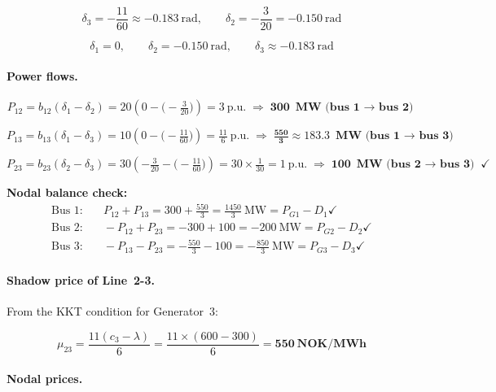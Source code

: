 \[
  \delta_3 = -\frac{11}{60} \approx -0.183~\text{rad},\qquad
  \delta_2 = -\frac{3}{20} = -0.150~\text{rad}
\]

\[
  \delta_1 = 0,\qquad
  \delta_2 = -0.150~\text{rad},\qquad
  \delta_3 \approx -0.183~\text{rad}
\]

\paragraph{Power flows.}

\[
  P_{12} = b_{12}(\delta_1 - \delta_2)
         = 20\!\left(0 - \bigl(-\tfrac{3}{20}\bigr)\right)
         = 3~\text{p.u.}
         \;\Rightarrow\; \mathbf{300~\text{MW (bus 1 $\to$ bus 2)}}
\]

\[
  P_{13} = b_{13}(\delta_1 - \delta_3)
         = 10\!\left(0 - \bigl(-\tfrac{11}{60}\bigr)\right)
         = \tfrac{11}{6}~\text{p.u.}
         \;\Rightarrow\; \mathbf{\tfrac{550}{3} \approx 183.3~\text{MW (bus 1 $\to$ bus 3)}}
\]

\[
  P_{23} = b_{23}(\delta_2 - \delta_3)
         = 30\!\left(-\tfrac{3}{20} - \bigl(-\tfrac{11}{60}\bigr)\right)
         = 30 \times \tfrac{1}{30}
         = 1~\text{p.u.}
         \;\Rightarrow\; \mathbf{100~\text{MW (bus 2 $\to$ bus 3)}} \;\checkmark
\]

\noindent\textbf{Nodal balance check:}
\begin{align*}
  \text{Bus 1:} &\quad P_{12} + P_{13} = 300 + \tfrac{550}{3} = \tfrac{1450}{3}~\text{MW}
                 = P_{G1} - D_1 \checkmark \\
  \text{Bus 2:} &\quad -P_{12} + P_{23} = -300 + 100 = -200~\text{MW}
                 = P_{G2} - D_2 \checkmark \\
  \text{Bus 3:} &\quad -P_{13} - P_{23} = -\tfrac{550}{3} - 100 = -\tfrac{850}{3}~\text{MW}
                 = P_{G3} - D_3 \checkmark
\end{align*}

\paragraph{Shadow price of Line~2-3.}

From the KKT condition for Generator~3:

\[
  \mu_{23} = \frac{11(c_3 - \lambda)}{6}
           = \frac{11 \times (600 - 300)}{6}
           = \mathbf{550~\text{NOK/MWh}}
\]

\paragraph{Nodal prices.}

